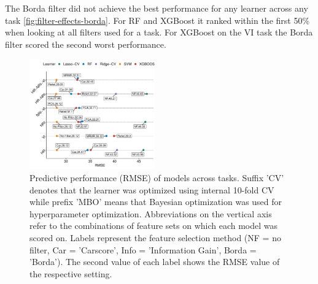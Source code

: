 \documentclass[letterpaper, peerreview]{IEEEtran}
\begin{document}
The Borda filter did not achieve the best performance for any learner across any task \autoref{fig:filter-effects-borda}.
For RF and XGBoost it ranked within the first 50\% when looking at all filters used for a task.
For XGBoost on the VI task the Borda filter scored the second worst performance.



%





\begin{figure} [t!]
	\centering
	\begin{center}
		\includegraphics[width=0.48\textwidth] {performance-results-1.pdf}
		\caption{Predictive performance (RMSE) of models across tasks. Suffix 'CV' denotes that the learner was optimized using internal 10-fold CV while prefix 'MBO' means that Bayesian optimization was used for hyperparameter optimization. Abbreviations on the vertical axis refer to the combinations of feature sets on which each model was scored on. Labels represent the feature selection method (NF = no filter, Car = 'Carscore', Info = 'Information Gain', Borda = 'Borda'). The second value of each label shows the RMSE value of the respective setting.}\label{fig:perf-result}
	\end{center}
\end{figure}
\end{document}
